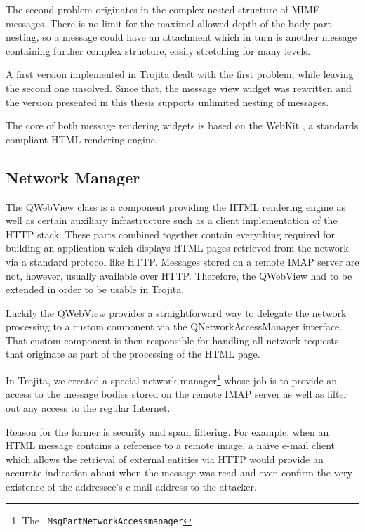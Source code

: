 \documentclass[12pt,notitlepage]{report}
\newcommand{\trojita}{Trojita\xspace}
\begin{document}
The second problem originates in the complex nested structure of MIME messages.
There is no limit for the maximal allowed depth of the body part nesting, so a
message could have an attachment which in turn is another message containing
further complex structure, easily stretching for many levels.

A first version implemented in \trojita dealt with the first problem, while
leaving the second one unsolved.  Since that, the message view widget was
rewritten and the version presented in this thesis supports unlimited nesting of
messages.

The core of both message rendering widgets is based on the WebKit
\cite{qt-webkit}, a standards compliant HTML rendering engine.

\subsection{Network Manager}
\label{network-manager}

The QWebView class is a component providing the HTML rendering engine as well as
certain auxiliary infrastructure such as a client implementation of the HTTP
stack.  These parts combined together contain everything required for building an
application which displays HTML pages retrieved from the network via a standard
protocol like HTTP.  Messages stored on a remote IMAP server are not, however,
usually available over HTTP.  Therefore, the QWebView had to be extended in order
to be usable in \trojita.

Luckily the QWebView provides a straightforward way to delegate the network
processing to a custom component via the QNetworkAccessManager interface.  That
custom component is then responsible for handling all network requests that
originate as part of the processing of the HTML page.

In \trojita, we created a special network manager\footnote{The {\tt
MsgPartNetworkAccessmanager}} whose job is to provide an access to the message
bodies stored on the remote IMAP server as well as filter out any access to the
regular Internet.

Reason for the former is security and spam filtering.  For example, when an HTML
message contains a reference to a remote image, a naive e-mail client which
allows the retrieval of external entities via HTTP would provide an accurate
indication about when the message was read and even confirm the very existence
of the addressee's e-mail address to the attacker.
\end{document}
